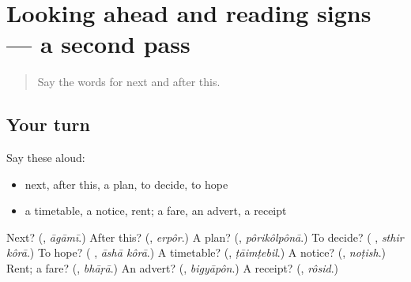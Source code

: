 \section[(dialogue)]{Looking ahead and reading signs — a second pass}

\label{lesson:BN-R147-second-pass-looking-ahead-and-reading-signs}



\begin{quote}
Say the words for next and after this.
\end{quote}

\subsection*{Your turn}
Say these aloud:

\begin{itemize}
\raggedright
  \item next, after this, a plan, to decide, to hope
  \item a timetable, a notice, rent; a fare, an advert, a receipt
\end{itemize}

\begin{tcolorbox}[breakable,colback=teal!4,colframe=teal!35!black,title={Before you move on}]
Next? (\textbf{}, \emph{āgāmī}.) After this? (\textbf{}, \emph{erpôr}.) A plan? (\textbf{}, \emph{pôrikôlpônā}.) To decide? (\textbf{ }, \emph{sthir kôrā}.) To hope? (\textbf{ }, \emph{āshā kôrā}.) A timetable? (\textbf{}, \emph{ṭāimṭebil}.) A notice? (\textbf{}, \emph{noṭish}.) Rent; a fare? (\textbf{}, \emph{bhāṛā}.) An advert? (\textbf{}, \emph{bigyāpôn}.) A receipt? (\textbf{}, \emph{rôsid}.)
\end{tcolorbox}
